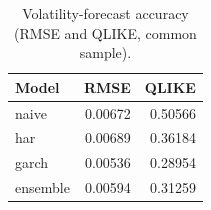 \begin{table}[htbp]
\centering
\caption{Volatility-forecast accuracy (RMSE and QLIKE, common sample).}
\label{tab:volmetrics}
\small
\begin{tabular}{lrr}
\toprule
Model & RMSE & QLIKE \\
\midrule
naive & 0.00672 & 0.50566 \\
har & 0.00689 & 0.36184 \\
garch & 0.00536 & 0.28954 \\
ensemble & 0.00594 & 0.31259 \\
\bottomrule
\end{tabular}
\end{table}
